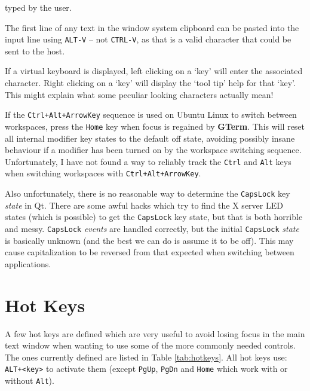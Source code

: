 \documentclass[a4paper,twoside,11pt]{article}
\newcommand{\newpara}{\par\vspace{4mm}\noindent}
\begin{document}
typed by the user.
\newpara
The first line of any text in the window system clipboard can be pasted into the input line using \texttt{ALT-V} -- not
\texttt{CTRL-V}, as that is a valid character that could be sent to the host.
\newpara
If a virtual keyboard is displayed, left clicking on a `key' will enter the associated character.
Right clicking on a `key' will display the `tool tip' help for that `key'. This might explain what
some peculiar looking characters actually mean!
\newpara
If the \texttt{Ctrl+Alt+ArrowKey} sequence is used on Ubuntu Linux to switch between workspaces, press 
the \texttt{Home} key when focus is regained by \textbf{GTerm}. This will reset all internal modifier key states
to the default off state, avoiding possibly insane behaviour if a modifier has been turned on by
the workspace switching sequence.
Unfortunately, I have not found a way to reliably
track the \texttt{Ctrl} and \texttt{Alt} keys when switching workspaces with \texttt{Ctrl+Alt+ArrowKey}.
\newpara
Also unfortunately, there is no reasonable way to determine the \texttt{CapsLock} key \textit{state}
in Qt. There are some awful hacks which try to find the X server LED states (which is possible) to
get the \texttt{CapsLock} key state, but that is both horrible and messy. 
\texttt{CapsLock} \textit{events} are handled correctly,
but the initial \texttt{CapsLock} \textit{state} is basically unknown (and the
best we can do is assume it to be off). This may cause capitalization to be reversed from
that expected when switching between applications.

\section{Hot Keys}
A few hot keys are defined which are very useful to avoid losing focus in the main text window when
wanting to use some of the more commonly needed controls. The ones currently defined are listed in
Table \ref{tab:hotkeys}. All hot keys use: \texttt{ALT+<key>} to activate them (except \texttt{PgUp},
\texttt{PgDn} and \texttt{Home} which work with or without \texttt{Alt}).
\end{document}
